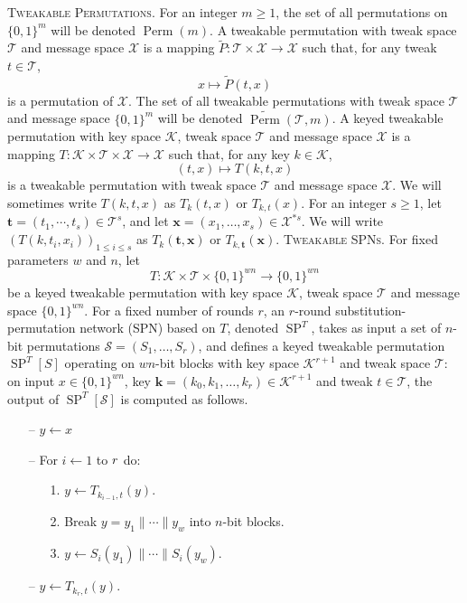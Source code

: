 \textsc{Tweakable Permutations.} For an integer $m \geq 1$, the set of all permutations
on $\{0,1\}^{m}$ will be denoted $\operatorname{Perm}(m)$. A tweakable permutation with tweak space $\mathcal{T}$ and message space $\mathcal{X}$ is a mapping $\widetilde{P} :\mathcal{T} \times \mathcal{X} \rightarrow \mathcal{X}$ such that, for any tweak $t \in \mathcal{T}$,
$$
x \mapsto \widetilde{P}(t,x)
$$
\noindent is a permutation of $\mathcal{X}$. The set of all tweakable permutations with tweak space $\mathcal{T}$ and message space $\{0,1\}^{m}$ will be denoted $\widetilde{\operatorname{Perm}}(\mathcal{T}, m)$.
  A keyed tweakable permutation with key space $\mathcal{K}$, tweak space $\mathcal{T}$ and message space $\mathcal{X}$ is a mapping $T : \mathcal{K} \times \mathcal{T} \times \mathcal{X} \rightarrow \mathcal{X}$ such that, for any key $k \in \mathcal{K}$,
$$
(t,x) \mapsto T(k,t,x)
$$
\noindent is a tweakable permutation with tweak space $\mathcal{T}$ and message space $\mathcal{X}$. We will sometimes write $T(k,t,x)$ as $T_k(t,x)$ or $T_{k,t}(x)$. For an integer $s \geq 1$, let $\mathbf{t}=(t_1, \cdots, t_s) \in \mathcal{T}^s$, and let $\mathbf{x}=(x_1, \ldots, x_s) \in \mathcal{X}^{\ast s}$. We will write $(T(k, t_i, x_i))_{1 \leq i \leq s}$ as $T_k(\mathbf{t}, \mathbf{x})$ or $T_{k, \mathbf{t}}(\mathbf{x})$.
\textsc{Tweakable SPNs.} For fixed parameters $w$ and $n$, let
$$
T: \mathcal{K} \times \mathcal{T} \times \{0,1\}^{w n} \rightarrow \{0,1\}^{w n}
$$
\noindent be a keyed tweakable permutation with key space $\mathcal{K}$, tweak space $\mathcal{T}$ and message space $\{0,1\}^{w n}$.
  For a fixed number of rounds $r$, an $r$-round substitution-permutation network (SPN) based on $T$, denoted $\operatorname{SP}^T$, takes as input a set of $n$-bit permutations $\mathcal{S} = (S_1, \ldots, S_r)$, and defines a keyed tweakable permutation $\operatorname{SP}^{T}[S]$ operating on $w n$-bit blocks with key space $\mathcal{K}^{r+1}$ and tweak space $\mathcal{T}$: on input $x \in \{0,1\}^{w n}$, key $\mathbf{k} = (k_0, k_1, \ldots, k_r) \in \mathcal{K}^{r+1}$ and tweak $t \in \mathcal{T}$, the output of $\operatorname{SP}^T[\mathcal{S}]$ is computed as follows.
  
\begin{itemize}
  \item[--]
  $y \leftarrow x$
  \item[--]
  For $i \leftarrow 1$ to $\mathnormal{r}$ do:
  \begin{itemize}
    \item[1.]
    $y \leftarrow T_{k_{i-1}, t}(y)$.
    \item[2.]
    Break $y = y_1 \| \cdots \| y_w$ into $n$-bit blocks.
    \item[3.]
   $y \leftarrow S_i(y_1) \| \cdots \| S_i(y_w)$.
  \end{itemize}
  \item[--]
  $y \leftarrow T_{k_{r}, t}(y)$.
\end{itemize}

